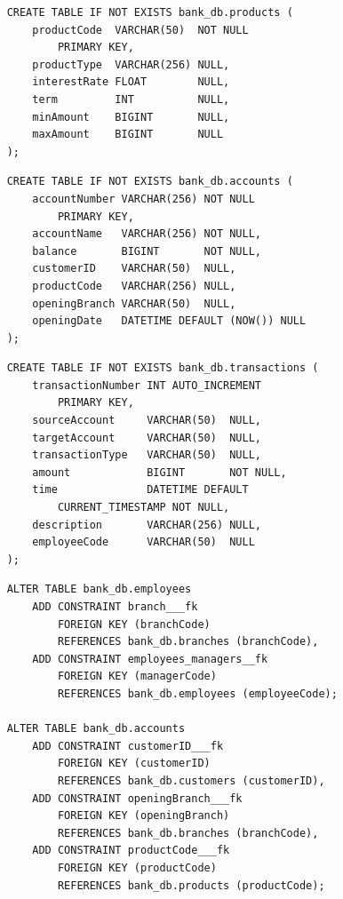 \begin{enumerate}[label=\alph*.]
        
    \begin{lstlisting}
    CREATE TABLE IF NOT EXISTS bank_db.products (
        productCode  VARCHAR(50)  NOT NULL 
            PRIMARY KEY,
        productType  VARCHAR(256) NULL,
        interestRate FLOAT        NULL,
        term         INT          NULL,
        minAmount    BIGINT       NULL,
        maxAmount    BIGINT       NULL
    );
    \end{lstlisting}

        
    \begin{lstlisting}
    CREATE TABLE IF NOT EXISTS bank_db.accounts (
        accountNumber VARCHAR(256) NOT NULL 
            PRIMARY KEY,
        accountName   VARCHAR(256) NOT NULL,
        balance       BIGINT       NOT NULL,
        customerID    VARCHAR(50)  NULL,
        productCode   VARCHAR(256) NULL,
        openingBranch VARCHAR(50)  NULL,
        openingDate   DATETIME DEFAULT (NOW()) NULL
    );
    \end{lstlisting}

        
    \begin{lstlisting}
    CREATE TABLE IF NOT EXISTS bank_db.transactions (
        transactionNumber INT AUTO_INCREMENT
            PRIMARY KEY,
        sourceAccount     VARCHAR(50)  NULL,
        targetAccount     VARCHAR(50)  NULL,
        transactionType   VARCHAR(50)  NULL,
        amount            BIGINT       NOT NULL,
        time              DATETIME DEFAULT 
            CURRENT_TIMESTAMP NOT NULL,
        description       VARCHAR(256) NULL,
        employeeCode      VARCHAR(50)  NULL
    );
    \end{lstlisting}
        
    \newpage


    \begin{lstlisting}
    ALTER TABLE bank_db.employees
        ADD CONSTRAINT branch___fk
            FOREIGN KEY (branchCode) 
            REFERENCES bank_db.branches (branchCode),
        ADD CONSTRAINT employees_managers__fk
            FOREIGN KEY (managerCode) 
            REFERENCES bank_db.employees (employeeCode);

    ALTER TABLE bank_db.accounts
        ADD CONSTRAINT customerID___fk
            FOREIGN KEY (customerID) 
            REFERENCES bank_db.customers (customerID),
        ADD CONSTRAINT openingBranch___fk
            FOREIGN KEY (openingBranch) 
            REFERENCES bank_db.branches (branchCode),
        ADD CONSTRAINT productCode___fk
            FOREIGN KEY (productCode) 
            REFERENCES bank_db.products (productCode);


\end{lstlisting}
\end{enumerate}
